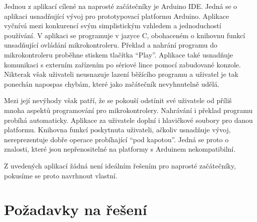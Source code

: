 Jednou z aplikací cílené na naprosté začátečníky je Arduino IDE\todocite. Jedná se o aplikaci usnadňující vývoj pro prototypovací platformu Arduino\todocite. Aplikace vyčnívá mezi konkurencí svým simplistickým vzhledem a jednoduchostí používání. V aplikaci se programuje v jazyce C, obohaceném o knihovnu funkcí unsadňující ovládání mikrokontroleru. Překlad a nahrání programu do mikrokontroleru proběhne stiskem tlačítka ``Play''. Aplikace také usnadňuje komunikaci s externím zařízením po sériové lince pomocí zabudované konzole. Nikterak však uživateli neusnazuje lazení běžícího programu a uživatel je tak ponechán napospas chybám, které jako začátečník nevyhnutelně udělá.

Mezi její nevýhody však patří, že se pokouší odstínit své uživatele od příliš mnoha aspektů programování pro mikrokontrolery. Nahrávání i překlad programu probíhá automaticky. Aplikace za uživatele doplní i hlavičkové soubory pro danou platformu. Knihovna funkcí poskytnuta uživateli, ačkoliv usnadňuje vývoj, nereprezentuje dobře operace probíhající ``pod kapotou''. Jedná se proto o znalosti, které jsou nepřenositelné na platformy s Arduinem nekompatibilní.


Z uvedených aplikací žádná není ideálním řešením pro naprosté začátečníky, pokusíme se proto navrhnout vlastní.

\section{Požadavky na řešení}

